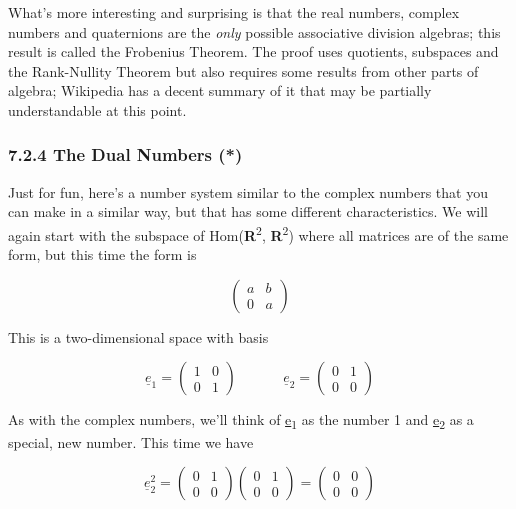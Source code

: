 \documentclass[oneside,english]{amsbook}
\numberwithin{section}{chapter}
\theoremstyle{plain}
\theoremstyle{definition}
\begin{document}
What's more interesting and surprising is that the real numbers, complex
numbers and quaternions are the \emph{only} possible associative
division algebras; this result is called the Frobenius Theorem. The
proof uses quotients, subspaces and the Rank-Nullity Theorem but also
requires some results from other parts of algebra; Wikipedia has a
decent summary of it that may be partially understandable at this point.

\subsubsection{7.2.4 The Dual Numbers (*)}\label{the-dual-numbers}

Just for fun, here's a number system similar to the complex numbers that
you can make in a similar way, but that has some different
characteristics. We will again start with the subspace of
Hom(\textbf{R}\textsuperscript{2}, \textbf{R}\textsuperscript{2}) where
all matrices are of the same form, but this time the form is

\[\begin{pmatrix}
	a & b \\
	0 & a
\end{pmatrix}\]

This is a two-dimensional space with basis

\[{\underline{e}}_{1} = \begin{pmatrix}
	1 & 0 \\
	0 & 1
\end{pmatrix}\ \ \ \ \ \ \ \ \ \ \ \ \ \ \ {\underline{e}}_{2} = \begin{pmatrix}
	0 & 1 \\
	0 & 0
\end{pmatrix}\]

As with the complex numbers, we'll think of \ul{e}\textsubscript{1} as
the number 1 and \ul{e}\textsubscript{2} as a special, new number. This
time we have

\[{\underline{e}}_{2}^{2} = \begin{pmatrix}
	0 & 1 \\
	0 & 0
\end{pmatrix}\begin{pmatrix}
	0 & 1 \\
	0 & 0
\end{pmatrix} = \begin{pmatrix}
	0 & 0 \\
	0 & 0
\end{pmatrix}\]
\end{document}
